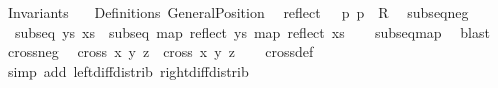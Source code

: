 %
\begin{isabellebody}%
%
%
\isadelimtheory
%
\endisadelimtheory
%
\isatagtheory
{}\isamarkupfalse%
\ Invariants\isanewline
\ \ \ Definitions\ GeneralPosition{}\isanewline
\isanewline
{}%
\endisatagtheory
{\isafoldtheory}%
%
\isadelimtheory
\isanewline
%
\endisadelimtheory
\isanewline
{}\isamarkupfalse%
\isanewline
\ \ {\isachardoublequoteopen}reflect\ {\isasymequiv}\ {\isacharparenleft}{\kern0pt}{\isasymlambda}\ p{\isachardot}{\kern0pt}\ {\isacharminus}{\kern0pt}{\isacharparenleft}{\kern0pt}p\ {\isacharcolon}{\kern0pt}{\isacharcolon}{\kern0pt}\ R{}{\isacharparenright}{\kern0pt}{\isacharparenright}{\kern0pt}{\isachardoublequoteclose}\ \isanewline
\isanewline
{}\isamarkupfalse%
\ subseq{\isacharunderscore}{\kern0pt}neg{\isacharcolon}{\kern0pt}\isanewline
\ \ {\isachardoublequoteopen}subseq\ ys\ xs\ {\isasymLongrightarrow}\ subseq\ {\isacharparenleft}{\kern0pt}map\ reflect\ ys{\isacharparenright}{\kern0pt}\ {\isacharparenleft}{\kern0pt}map\ reflect\ xs{\isacharparenright}{\kern0pt}{\isachardoublequoteclose}\isanewline
%
\isadelimproof
\ \ %
\endisadelimproof
%
\isatagproof
{}\isamarkupfalse%
\ subseq{\isacharunderscore}{\kern0pt}map\ \isamarkupfalse%
\ blast%
\endisatagproof
{\isafoldproof}%
%
\isadelimproof
\isanewline
%
\endisadelimproof
\isanewline
{}\isamarkupfalse%
\ cross{}{\isacharunderscore}{\kern0pt}neg{\isacharcolon}{\kern0pt}\isanewline
\ \ {\isachardoublequoteopen}cross{}\ x\ y\ z\ {\isacharequal}{\kern0pt}\ cross{}\ {\isacharparenleft}{\kern0pt}{\isacharminus}{\kern0pt}x{\isacharparenright}{\kern0pt}\ {\isacharparenleft}{\kern0pt}{\isacharminus}{\kern0pt}y{\isacharparenright}{\kern0pt}\ {\isacharparenleft}{\kern0pt}{\isacharminus}{\kern0pt}z{\isacharparenright}{\kern0pt}{\isachardoublequoteclose}\isanewline
%
\isadelimproof
\ \ %
\endisadelimproof
%
\isatagproof
{}\isamarkupfalse%
\ cross{}{\isacharunderscore}{\kern0pt}def\isanewline
\ \ \isamarkupfalse%
\ {\isacharparenleft}{\kern0pt}simp\ add{\isacharcolon}{\kern0pt}\ left{\isacharunderscore}{\kern0pt}diff{\isacharunderscore}{\kern0pt}distrib{\isacharprime}{\kern0pt}\ right{\isacharunderscore}{\kern0pt}diff{\isacharunderscore}{\kern0pt}distrib{\isacharprime}{\kern0pt}{\isacharparenright}{\kern0pt}%
\endisatagproof
{\isafoldproof}%
%
\isadelimproof
\isanewline

\end{isabellebody}
